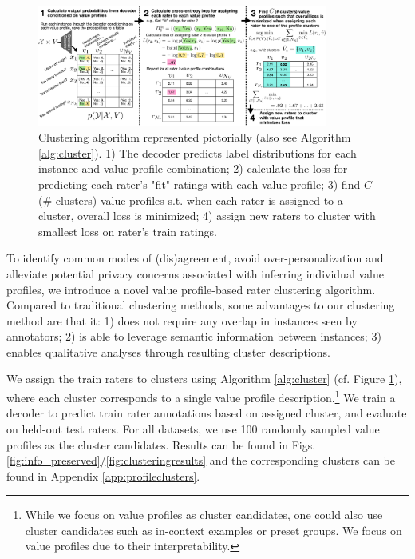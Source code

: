 \documentclass[11pt]{article}
\begin{document}
\begin{figure}[ht]
\centering
\vspace{-5pt}
\includegraphics[width=0.85\textwidth]{files/clusterfig.pdf}
\vspace{-5pt}
\caption{Clustering algorithm represented pictorially (also see Algorithm \ref{alg:cluster}).
1) The decoder predicts label distributions for each instance and value profile combination;
2) calculate the loss for predicting each rater's "fit" ratings with each value profile;
3) find $C$ (\# clusters) value profiles s.t. when each rater is assigned to a cluster, overall loss is minimized;
4) assign new raters to cluster with smallest loss on rater's train ratings.
}
\label{fig:clusteralgo}
\end{figure}

To identify common modes of (dis)agreement, avoid over-personalization \citep{kirk2024benefits} and alleviate potential privacy concerns associated with inferring individual value profiles, we introduce a novel value profile-based rater clustering algorithm. Compared to traditional clustering methods, some advantages to our clustering method are that it: 1) does not require any overlap in instances seen by annotators; 2) is able to leverage semantic information between instances; 3) enables qualitative analyses through resulting cluster descriptions.

We assign the train raters to clusters using Algorithm \ref{alg:cluster} (cf. Figure \ref{fig:clusteralgo}), where each cluster corresponds to a single value profile description.\footnote{While we focus on value profiles as cluster candidates, one could also use cluster candidates such as in-context examples or preset groups. We focus on value profiles due to their interpretability.} We train a decoder to predict train rater annotations based on assigned cluster, and evaluate on held-out test raters. For all datasets, we use 100 randomly sampled value profiles as the cluster candidates. Results can be found in Figs. \ref{fig:info_preserved}/\ref{fig:clusteringresults} and the corresponding clusters can be found in Appendix \ref{app:profileclusters}.
\end{document}
